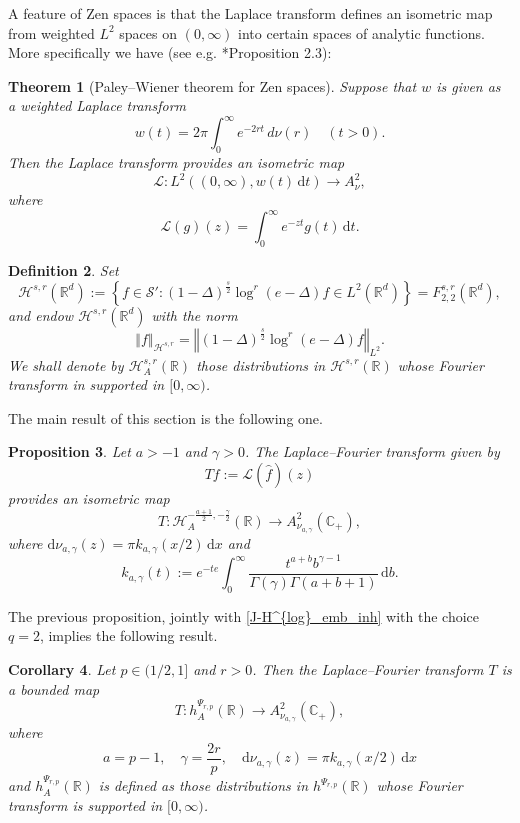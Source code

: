 \documentclass[a4paper, leqno, 10pt]{amsart}
\numberwithin{equation}{section}
\newtheorem{thm}{Theorem}
\newtheorem{corollary}[thm]{Corollary}
\newtheorem{proposition}[thm]{Proposition}
\newtheorem{define}[thm]{Definition}
\newcommand{\dd}{\mathrm{d}}
\newcommand{\R}{\mathbb{R}}
\newcommand{\norm}[1]{\left\Vert#1\right\Vert}
\newcommand{\set}[1]{\left\{#1\right\}}
\newcommand{\C}{\mathbb{C}}
\begin{document}
A feature of Zen spaces is that the Laplace transform
defines an isometric map  from weighted
$L^2$ spaces on $(0,\infty)$ into certain spaces of analytic functions. More specifically we have (see e.g. \cite{JPP}*{Proposition 2.3}):
\begin{thm}[Paley–Wiener theorem for Zen spaces]\label{thm:Paley_Wiener}
Suppose that $w$ is given as a weighted Laplace transform
\[
w(t)=2\pi \int_0^\infty e^{-2rt} \, d\nu(r) \quad (t >0).
\]
Then the Laplace transform provides an isometric map 
\[
\mathcal{L}:  L^2((0,\infty),   w(t) \, \dd t ) \to A^2_\nu,
\]
where 
\[
\mathcal{L}(g)(z)=\int_0^\infty e^{-zt} g(t) \, \dd t .
\]
\end{thm}

\begin{define}
Set 
\[
\mathcal{H}^{s,r}(\R^d):=\set{f\in \mathcal{S}': (1-\Delta)^{\frac{s}{2}}\log^{r}(e-\Delta) f\in L^2(\R^d)}=F^{s,r}_{2,2}(\R^d),
\]
and endow $\mathcal{H}^{s,r}(\R^d)$ with the norm 
\[
\norm{f}_{\mathcal{H}^{s,r}}=\norm{(1-\Delta)^{\frac{s}{2}}\log^{r}(e-\Delta) f}_{L^2}.
\]
We shall denote by  $\mathcal{H}_A^{s,r}(\R)$ those distributions in $\mathcal{H}^{s,r}(\R)$ whose Fourier transform in supported in $[0,\infty)$.
\end{define}

The main result of this section is the following one.
\begin{proposition}
\label{prop:logartimic_smoothness_embedd} Let $a>-1$ and $\gamma>0$. The Laplace--Fourier transform given by
\[
Tf:=\mathcal{L}(\widehat{f})(z)
\] 
provides an isometric map 
\[
T:\mathcal{H}_A^{-\frac{a+1}{2},-\frac{\gamma}{2}}(\R) \to A^{2}_{\nu_{a,\gamma}}(\C_+),
\]
where $\dd\nu_{a,\gamma}(z)=\pi k_{a,\gamma}(x/2)\, \dd x$ and
\begin{equation}\label{kfunction}
    k_{a,\gamma}(t):=e^{-te}\int_0^\infty \frac{t^{a+b}b^{\gamma-1}}{\Gamma(\gamma)\Gamma(a+b+1)} \, \dd b.
\end{equation}
\end{proposition}

The previous proposition, jointly with \eqref{J-H^{log}_emb_inh} with the choice $q=2$, implies the following result.
\begin{corollary}\label{cor:embedding_Analytic} Let $p \in (1/2,1]$  and $r>0$. Then the Laplace--Fourier transform $T$ is a bounded map 
\[
T: h^{\Psi_{r,p}}_A(\R)\to A^{2}_{\nu_{a,\gamma}}(\C_+),
\] 
where 
\[
a=p-1,\quad \gamma=\frac{2r}{p}, \quad \dd\nu_{a,\gamma}(z)=\pi k_{a,\gamma}(x/2) \, \dd x
\]
and $h^{\Psi_{r,p}}_A(\R)$ is defined as those distributions in $h^{\Psi_{r,p}}(\R)$ whose Fourier transform is supported in $[0,\infty)$.
\end{corollary}
\end{document}
